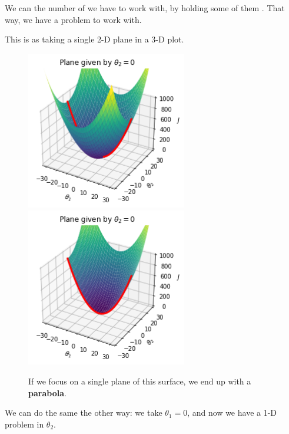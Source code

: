         \begin{concept}
            We can  the number of  we have to work with, by holding some of them . That way, we have a  problem to work with.
            
            This is  as taking a single 2-D plane in a 3-D plot.
        \end{concept}
        
        \begin{figure}[H]
                \includegraphics[width=70mm,scale=0.5]{images/gradient_descent_images/theta2_eq_0_unsliced.png}
                \includegraphics[width=70mm,scale=0.5]{images/gradient_descent_images/theta2_eq_0_sliced.png}
            
            \caption*{If we focus on a single plane of this surface, we end up with a \textbf{parabola}.}
        \end{figure}
        
        We can do the same the other way: we take $\theta_1=0$, and now we have a 1-D problem in $\theta_2$.
        
